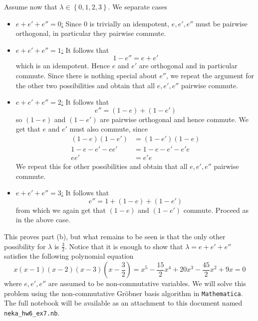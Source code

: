 \documentclass[a4paper, 12pt]{article}
\begin{document}
\begin{Exercise}
    Assume now that $\lambda \in \left\{ 0, 1, 2, 3 \right\}$.
    We separate cases
    \begin{itemize}
        \item \underline{$e + e' + e'' = 0$:}
            Since $0$ is trivially an idempotent, $e, e', e''$ must be pairwise orthogonal,
            in particular they pairwise commute.
        \item \underline{$e + e' + e'' = 1$:}
            It follows that 
            \[
                1 - e'' = e + e'
            \]
            which is an idempotent.
            Hence $e$ and $e'$ are orthogonal and in particular commute.
            Since there is nothing special about $e''$, we repeat the argument for the other two possibilities and obtain that all $e, e', e''$ pairwise commute.
        \item \underline{$e + e' + e'' = 2$:}
            It follows that 
            \[
                e'' = (1 - e) + (1 - e')
            \]
            so $(1-e)$ and $(1-e')$ are pairwise orthogonal and hence commute.
            We get that $e$ and $e'$ must also commute, since
            \begin{align*}
                (1 - e)(1 - e') &= (1 - e')(1 - e) \\
                1 - e - e' - ee' &= 1 - e - e' - e'e \\
                ee' &= e'e
            \end{align*}
            We repeat this for other possibilities and obtain that all $e, e', e''$ pairwise commute.
        \item \underline{$e + e' + e'' = 3$:}
            It follows that
            \[
                e'' = 1 + (1 - e) + (1 - e')
            \]
            from which we again get that $(1 - e)$ and $(1 - e')$ commute. Proceed as in the above case.
    \end{itemize}

    This proves part (b), but what remains to be seen is that the only other possibility for $\lambda$ is $\frac{3}{2}$.
    Notice that it is enough to show that $\lambda = e + e' + e''$ satisfies the following polynomial equation
    \[
        x(x - 1)(x - 2)(x - 3)(x - \frac{3}{2}) = x^5 - \frac{15}{2}x^4 + 20x^3 - \frac{45}{2}x^2 + 9x = 0
    \]
    where $e, e', e''$ are assumed to be non-commutative variables.
    We will solve this problem using the non-commutative Gr\"obner basis algorithm in \texttt{Mathematica}.
    The full notebook will be available as an attachment to this document named \verb|neka_hw6_ex7.nb|.
    

\end{Exercise}
\end{document}
